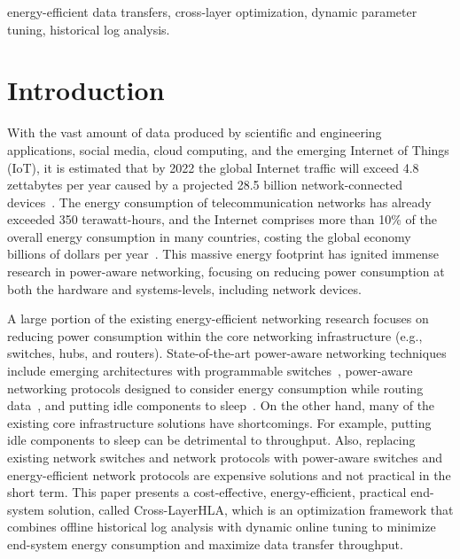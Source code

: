 \documentclass[conference]{IEEEtran}
\begin{document}
\begin{IEEEkeywords}
energy-efficient data transfers, cross-layer optimization, dynamic parameter tuning, historical log analysis.
\end{IEEEkeywords}

\section{Introduction}
With the vast amount of data produced by scientific and engineering applications, social media, cloud computing, and the emerging Internet of Things (IoT), it is estimated that by 2022 the global Internet traffic will exceed 4.8 zettabytes per year caused by a projected 28.5 billion network-connected devices~\cite{CiscoWhitePaper2020}. 
%
The energy consumption of telecommunication networks has already exceeded 350 terawatt-hours, and the Internet comprises more than 10\% of the overall energy consumption in many countries, costing the global economy billions of dollars per year~\cite{GWATT}.
%
This massive energy footprint has ignited immense research in power-aware networking, focusing on reducing power consumption at both the hardware and systems-levels, including network devices.

A large portion of the existing energy-efficient networking research focuses on reducing power consumption within the core networking infrastructure (e.g., switches, hubs, and routers). State-of-the-art power-aware networking techniques include emerging architectures with programmable switches~\cite{greenberg2008towards}, power-aware networking protocols designed to consider energy consumption while routing data~\cite{chabarek2008power}, and putting idle components to sleep~\cite{gupta2003greening}. On the other hand, many of the existing core infrastructure solutions have shortcomings. For example, putting idle components to sleep can be detrimental to throughput. Also, replacing existing network switches and network protocols with power-aware switches and energy-efficient network protocols are expensive solutions and not practical in the short term. This paper presents a cost-effective, energy-efficient, practical end-system solution, called Cross-LayerHLA, which is an optimization framework that combines offline historical log analysis with dynamic online tuning to minimize end-system energy consumption and maximize data transfer throughput.
\end{document}
